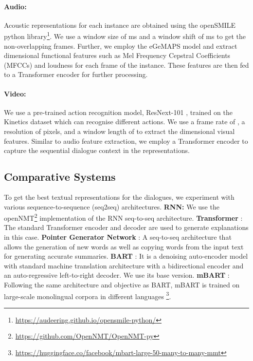 \documentclass[11pt]{article}
\begin{document}
    \paragraph{Audio:} Acoustic representations for each instance are obtained using the openSMILE python library\footnote{\url{https://audeering.github.io/opensmile-python/}}. We use a window size of  ms and a window shift of  ms to get the non-overlapping frames. Further, we employ the eGeMAPS model \cite{eyben2015geneva} and extract  dimensional functional features such as Mel Frequency Cepstral Coefficients (MFCCs) and loudness for each frame of the instance. These features are then fed to a Transformer encoder \cite{vaswani2017attention} for further processing.
    \paragraph{Video:} We use a pre-trained action recognition model, ResNext-101 \cite{hara2018spatiotemporal}, trained on the Kinetics dataset \cite{kay2017kinetics} which can recognise  different actions. We use a frame rate of , a resolution of  pixels, and a window length of   to extract the  dimensional visual features. Similar to audio feature extraction, we employ a Transformer encoder \cite{vaswani2017attention} to capture the sequential dialogue context in the representations.
    
    \subsection{Comparative Systems}
        To get the best textual representations for the dialogues, we experiment with various sequence-to-sequence (seq2seq) architectures. \textbf{RNN:} We use the openNMT\footnote{\url{https://github.com/OpenNMT/OpenNMT-py}} implementation of the RNN seq-to-seq architecture.
        \textbf{Transformer} \cite{vaswani2017attention}: The standard Transformer encoder and decoder are used to generate explanations in this case. 
\textbf{Pointer Generator Network} \cite{see2017get}: A seq-to-seq architecture that allows the generation of new words as well as copying words from the input text for generating accurate summaries. \textbf{BART} \cite{lewis2019bart}: It is a denoising auto-encoder model with standard machine translation architecture with a bidirectional encoder and an auto-regressive left-to-right decoder. We use its base version.
        \textbf{mBART} \cite{liu2020multilingual}: Following the same architecture and objective as BART, mBART is trained on large-scale monolingual corpora in different languages \footnote{\url{https://huggingface.co/facebook/mbart-large-50-many-to-many-mmt}}.
 
\end{document}
